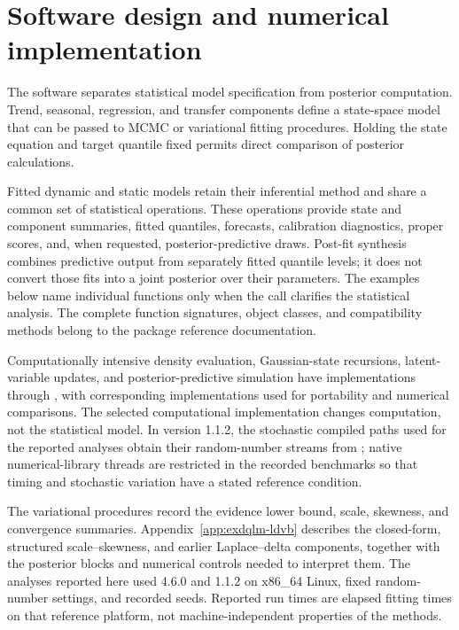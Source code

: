 \section{Software design and numerical implementation}
\label{exd:sec:design}
\label{exdqlm:sec:body-inference}

The software separates statistical model specification from posterior
computation. Trend, seasonal, regression, and transfer components define a
state-space model that can be passed to MCMC or variational fitting procedures.
Holding the state equation and target quantile fixed permits direct comparison
of posterior calculations.

Fitted dynamic and static models retain their inferential method and share a
common set of statistical operations. These operations provide state and
component summaries, fitted quantiles, forecasts, calibration diagnostics,
proper scores, and, when requested, posterior-predictive draws. Post-fit
synthesis combines predictive output from separately fitted quantile levels;
it does not convert those fits into a joint posterior over their parameters.
The examples below name individual functions only when the call clarifies the
statistical analysis. The complete function signatures, object classes, and
compatibility methods belong to the package reference documentation.

Computationally intensive density evaluation, Gaussian-state recursions,
latent-variable updates, and posterior-predictive simulation have
 implementations through , with corresponding
 implementations used for portability and numerical comparisons.
The selected computational implementation changes computation, not the statistical model. In version
1.1.2, the stochastic compiled paths used for the reported analyses obtain
their random-number streams from ; native numerical-library threads
are restricted in the recorded benchmarks so that timing and stochastic
variation have a stated reference condition.

The variational procedures record the evidence lower bound, scale, skewness,
and convergence summaries. Appendix~\ref{app:exdqlm-ldvb} describes the
closed-form, structured scale--skewness, and earlier Laplace--delta components,
together with the posterior blocks and numerical controls needed to interpret
them. The analyses reported here used  4.6.0 and
 1.1.2 on x86\_64 Linux, fixed random-number settings, and recorded
seeds. Reported run times are elapsed fitting times on that reference platform,
not machine-independent properties of the methods.

